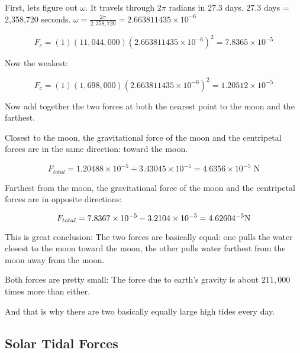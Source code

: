 \begin{Answer}[ref=life-orbits5]

First,  lets figure out $\omega$.   It travels through $2\pi$ radians in 27.3 days.  27.3 days = 2,358,720 seconds.    $\omega = \frac{2\pi}{2,358,720} = 2.663811435 \times 10^{-6}$

$$F_c = (1)(11,044,000)(2.663811435 \times 10^{-6})^2 = 7.8365 \times 10^{-5}$$

Now the weakest:

$$F_c = (1)(1,698,000)(2.663811435 \times 10^{-6})^2 = 1.20512 \times 10^{-5}$$

\end{Answer}


\begin{Exercise}[title={Life Among the Orbits 6: Net  Force}, label=life-orbits6]

Now add together the two forces at both the nearest point to the moon and the farthest.

\end{Exercise}

\begin{Answer}[ref=life-orbits6]

Closest to the moon,   the gravitational force of the moon and the centripetal forces are in the same direction: toward the moon.

$$F_{total} = 1.20488 \times 10^{-5} + 3.43045 \times 10^{-5} = 4.6356 \times 10^{-5} \text{ N}$$

Farthest from the moon,  the gravitational force of the moon and the centripetal forces are in opposite directions:

$$F_{total} = 7.8367 \times 10^{-5} - 3.2104 \times 10^{-5} = 4.62604 \time 10^{-5} \text{N}$$

This is great conclusion:  The two forces are basically equal: one pulls the water closest to the moon toward the moon,  the other pulls water farthest from the moon away from the moon.

Both forces are pretty small:  The force due to earth's gravity is about $211,000$ times more than either.

And that is why there are two basically equally large high tides every day.

\end{Answer}


\subsection{Solar Tidal Forces}

